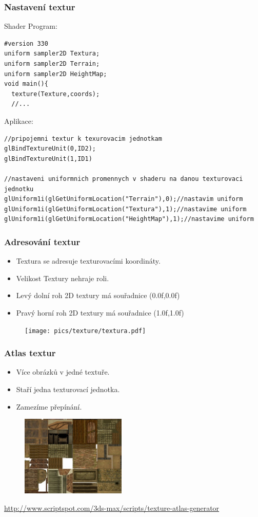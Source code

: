 \begin{frame}[fragile]
\frametitle{Nastavení textur}
Shader Program:
{\scriptsize
\begin{verbatim}
#version 330
uniform sampler2D Textura;
uniform sampler2D Terrain;
uniform sampler2D HeightMap;
void main(){
  texture(Texture,coords);
  //...
\end{verbatim}
}
Aplikace:
{\scriptsize
\begin{verbatim}
//pripojemni textur k texurovacim jednotkam
glBindTextureUnit(0,ID2);
glBindTextureUnit(1,ID1)

//nastaveni uniformnich promennych v shaderu na danou texturovaci jednotku
glUniform1i(glGetUniformLocation("Terrain"),0);//nastavim uniform
glUniform1i(glGetUniformLocation("Textura"),1);//nastavime uniform
glUniform1i(glGetUniformLocation("HeightMap"),1);//nastavime uniform
\end{verbatim}
}
\end{frame}

\begin{frame}[fragile]
\frametitle{Adresování textur}
	\begin{itemize}
	\item Textura se adresuje texturovacími koordináty.
	\item Velikost Textury nehraje roli.
	\item Levý dolní roh 2D textury má souřadnice (0.0f,0.0f)
	\item Pravý horní roh 2D textury má souřadnice (1.0f,1.0f)
	\end{itemize}
	\begin{figure}[h]
		\texttt{[image: pics/texture/textura.pdf]}
	\end{figure}
\end{frame}

\begin{frame}[fragile]
\frametitle{Atlas textur}
	\begin{itemize}
	\item Více obrázků v jedné textuře.
	\item Staří jedna texturovací jednotka.
	\item Zamezíme přepínání.
	\end{itemize}
	\begin{figure}[h]
		\includegraphics[width=5cm,keepaspectratio]{pics/texture/textureatlas.jpg}
	\end{figure}
	\url{http://www.scriptspot.com/3ds-max/scripts/texture-atlas-generator}
\end{frame}

